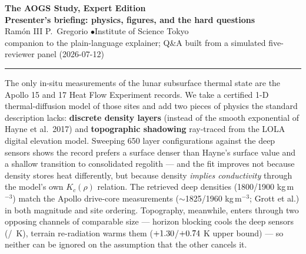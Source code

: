 \documentclass[11pt]{article}
\newcommand{\shead}[1]{\medskip\noindent{\color{teal}\large\bfseries #1}\par\nobreak\smallskip}
\begin{document}
\thispagestyle{empty}

\begin{center}
{\LARGE\bfseries The AOGS Study, Expert Edition}\\[2pt]
{\large\color{teal}\bfseries Presenter's briefing: physics, figures, and the hard questions}\\[4pt]
{\small Ram\'on III P.\ Gregorio \quad$\bullet$\quad Institute of Science Tokyo}\\[-2pt]
{\footnotesize\color{dim} companion to the plain-language explainer; Q\&A built from a
 simulated five-reviewer panel (2026-07-12)}
\end{center}
\vspace{2pt}
{\color{teal}\rule{\linewidth}{0.9pt}}

\shead{1\enspace The whole study in five sentences}
The only in-situ measurements of the lunar subsurface thermal state are the
Apollo 15 and 17 Heat Flow Experiment records. We take a certified 1-D
thermal-diffusion model of those sites and add two pieces of physics the
standard description lacks: \textbf{discrete density layers} (instead of the
smooth exponential of Hayne et al.\ 2017) and \textbf{topographic shadowing}
ray-traced from the LOLA digital elevation model. Sweeping 650 layer
configurations against the deep sensors shows the record prefers a surface
denser than Hayne's surface value and a shallow transition to consolidated
regolith --- and the fit improves not because density stores heat differently,
but because density \emph{implies conductivity} through the model's own
$K_c(\rho)$ relation. The retrieved deep densities (1800/1900 kg\,m$^{-3}$)
match the Apollo drive-core measurements (${\sim}$1825/1960 kg\,m$^{-3}$;
Grott et al.) in both magnitude and site ordering. Topography, meanwhile,
enters through two opposing channels of comparable size --- horizon blocking
cools the deep sensors (\shadowcoolAfif/\shadowcoolAsev\ K), terrain
re-radiation warms them ($+1.30$/$+0.74$ K upper bound) ---
so neither can be ignored on the assumption that the other cancels it.
\end{document}
